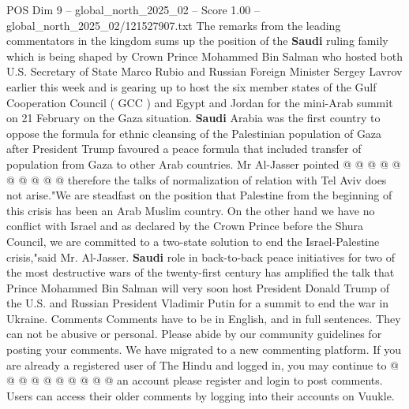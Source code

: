 \begin{textsample}{POS Dim 9 – global\_north\_2025\_02 – Score 1.00 – global\_north\_2025\_02/121527907.txt}
The remarks from the leading commentators in the kingdom sums up the position of the \textbf{Saudi} ruling family which is being shaped by Crown Prince Mohammed Bin Salman who hosted both U.S.
Secretary of State Marco Rubio and Russian Foreign Minister Sergey Lavrov earlier this week and is gearing up to host the six member states of the Gulf Cooperation Council ( GCC ) and Egypt and Jordan for the mini-Arab summit on 21 February on the Gaza situation. \textbf{Saudi} Arabia was the first country to oppose the formula for ethnic cleansing of the Palestinian population of Gaza after President Trump favoured a peace formula that included transfer of population from Gaza to other Arab countries.
Mr Al-Jasser pointed @ @ @ @ @ @ @ @ @ @ therefore the talks of normalization of relation with Tel Aviv does not arise."We are steadfast on the position that Palestine from the beginning of this crisis has been an Arab Muslim country.
On the other hand we have no conflict with Israel and as declared by the Crown Prince before the Shura Council, we are committed to a two-state solution to end the Israel-Palestine crisis,"said Mr.
Al-Jasser. \textbf{Saudi} role in back-to-back peace initiatives for two of the most destructive wars of the twenty-first century has amplified the talk that Prince Mohammed Bin Salman will very soon host President Donald Trump of the U.S. and Russian President Vladimir Putin for a summit to end the war in Ukraine.
Comments Comments have to be in English, and in full sentences.
They can not be abusive or personal.
Please abide by our community guidelines for posting your comments.
We have migrated to a new commenting platform.
If you are already a registered user of The Hindu and logged in, you may continue to @ @ @ @ @ @ @ @ @ @ an account please register and login to post comments.
Users can access their older comments by logging into their accounts on Vuukle.

\end{textsample}

